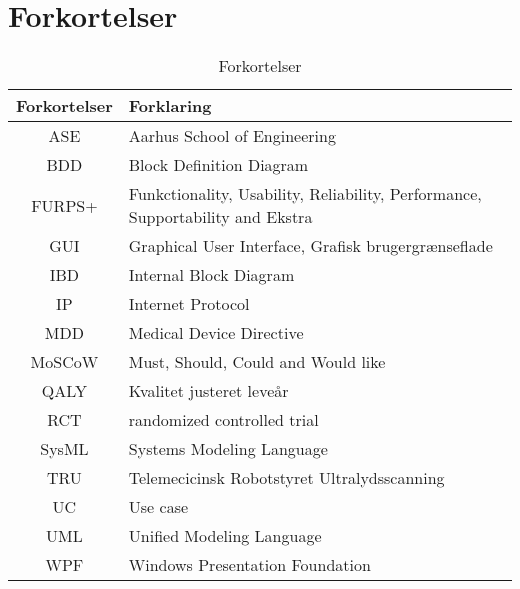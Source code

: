 \chapter{Forkortelser}

\begin{table}[htb]
\centering
\begin{tabular}{ | c | p{} | }
\hline
\textbf{Forkortelser} & \textbf{Forklaring} \\\hline
ASE & Aarhus School of Engineering \\\hline
BDD & Block Definition Diagram \\\hline
FURPS+ & Funkctionality, Usability, Reliability, Performance, Supportability and Ekstra \\\hline
GUI & Graphical User Interface, Grafisk brugergrænseflade \\\hline
IBD & Internal Block Diagram \\\hline
IP & Internet Protocol \\\hline
MDD & Medical Device Directive \\\hline
MoSCoW & Must, Should, Could and Would like \\\hline
QALY & Kvalitet justeret leveår  \\\hline
RCT & randomized controlled trial \\\hline
SysML & Systems Modeling Language \\\hline
TRU & Telemecicinsk Robotstyret Ultralydsscanning \\\hline
UC & Use case \\\hline
UML & Unified Modeling Language \\\hline
WPF & Windows Presentation Foundation \\\hline

\end{tabular}
\caption{Forkortelser}
\end{table}

\vspace{3cm}